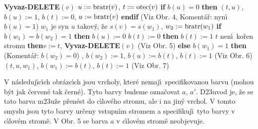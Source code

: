 {\bf Vyvaz-DELETE$(v)$\newline 
$u:=\operatorname{bratr}(v)$}, $t:=\operatorname{otec}(v)$\newline 
{\bf if} $b(u)=0$ {\bf then}\newline 
\phantom{---}{\bf Rotace}$(t,u)$, $b(u):=1$, $b(t):=0$, $u:=\operatorname{bratr}(v)$\newline 
{\bf endif\newline}
(Viz Obr. 4, Koment\'a\v r: nyn\'\i\ $b(u)=1$)\newline 
$w_1$ je syn $u$ takov\'y, \v ze $s(v)=s(w_1)$, $w_2:=\operatorname{bratr}(w_1)$\newline 
{\bf if} $b(w_1)=b(w_2)=1$ {\bf then}\newline 
\phantom{---}$b(u):=0$\newline 
\phantom{---}{\bf if} $b(t):=0$ {\bf then}\newline 
\phantom{------}$b(t):=1$\newline 
\phantom{---}{\bf else}\newline 
\phantom{------}{\bf if} $t$ nen\'\i\ ko\v ren stromu {\bf then}\newline \phantom{---------}$v:=t$, {\bf Vyvaz-DELETE}$(v)$\newline 
\phantom{------}{\bf endif}\newline 
\phantom{---}{\bf endif} (Viz Obr. 5)\newline 
{\bf else}\newline 
\phantom{---}{\bf if} $b(w_1)=1$ {\bf then}\newline 
(Koment\'a\v r: $b(w_2)=0$)\newline 
\phantom{------}{\bf Rotace$(t,u)$}, $b(w_2):=1$, $b(u):=b(t)$, $b(t):=1$ (Viz Obr. 6)\newline 
\phantom{---}{\bf else}\newline 
\phantom{------}{\bf Dvojita-rotace}$(t,u,w_1)$, $b(w_1):=b(t)$, $b(t):=1$ (Viz Obr. 7)\newline
\phantom{---}{\bf endif\newline 
endif}
\bigskip

\flushpar V n\'asleduj\'\i c\'\i ch obr\'azc\'\i ch jsou vrcholy, kter\'e 
nemaj\'\i\ specifikovanou barvu (mohou b\'yt jak \v cerven\'e tak \v cern\'e).
Tyto barvy budeme ozna\v covat $a$, $a'$. D\accent23uvod je, \v ze se 
tato barva m\accent23u\v ze p\v ren\'est do c\'\i lov\'eho stromu, ale 
i na jin\'y vrchol. V tomto smyslu jsou tyto barvy ur\v ceny vstupn\'\i m 
stromem a specifikuj\'\i\ tyto barvy v c\'\i lov\'em strom\v e. V Obr. 5 
se barva $a$ v c\'\i lov\'em strom\v e neobjevuje.
\medskip


